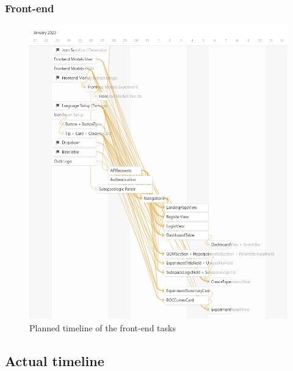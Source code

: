 \subsubsection*{Front-end}
\begin{figure}[!ht]
    \centering
    \includegraphics[width=\textwidth]{images/timeline-planned-frontend.png}
    \caption{Planned timeline of the front-end tasks}
    \label{fig:timeline-planned-frontend}
\end{figure}
\clearpage

\subsection{Actual timeline}
